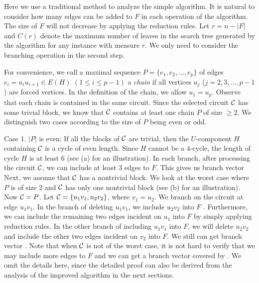 \documentclass[runningheads]{llncs}
\begin{document}
Here we use a traditional method to analyze the simple algorithm. It is natural to consider how many edges can be added to $F$ in each operation of the algorithm. The size of $F$ will not decrease by applying the reduction rules. Let $r=n-|F|$ and $C(r)$ denote the maximum number of leaves in the search tree generated by the algorithm for any instance with measure $r$.
We only need to consider the branching operation in the second step.

For convenience, we call a maximal sequence $P=\{e_1,e_2,\ldots ,e_p\}$ of edges $e_i=u_iu_{i+1}\in E(H)$ $(1\leq i\leq p-1)$  a {\em chain} if all vertices $u_j$ ($j=2,3,\ldots,p-1$) are forced vertices. In the definition of the chain, we allow $u_1=u_p$.
Observe that each chain is contained in the same circuit.
Since the selected circuit ${\cal C}$ has some trivial block, we know that ${\cal C}$ contains at least one chain $P$ of size $\geq 2$.
We distinguish two cases according to the size of $P$ being even or odd.

Case 1. $|P|$ is even: If all the blocks of ${\cal C}$ are trivial, then the $U$-component $H$ containing ${\cal C}$ is a cycle  of even length. Since $H$ cannot be a $4$-cycle, the length of cycle $H$ is at least $6$ (see (a) for an illustration).
In each branch, after processing the circuit ${\cal C}$, we can include at least $3$ edges to $F$. This gives us branch vector
Next, we assume that  ${\cal C}$ has a nontrivial block. We look at the worst case where $P$ is of size 2 and
 ${\cal C}$ has only one nontrivial block (see (b) for an illustration). Now ${\cal C}=P$.
 Let ${\cal C}=\{u_1v_1,u_2v_2\}$, where $v_1=u_2$.
We branch on the circuit at edge $u_1v_1$.
In the branch of deleting $u_1v_1$, we include $u_2v_2$ into $F$ .
Furthermore, we can include the remaining two edges incident on $u_1$ into $F$ by
 simply applying reduction rules. In the other branch of including $u_1v_1$ into $F$, we will delete $u_2v_2$ and include
 the other two edges incident on $v_2$ into $F$. We still can get branch vector .
Note that when ${\cal C}$ is not of the worst case, it is not hard to verify that we may include more edges to $F$ and we can get a branch vector covered by . We omit the details here, since the detailed proof can also be derived from the analysis of the improved algorithm in the next sections.
\vspace{-0mm}\vspace{-0mm}
\end{document}

